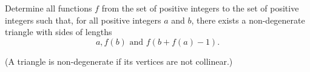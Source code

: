 Determine all functions $ f$ from the set of positive integers to the set of positive integers such that, for all positive integers $ a$ and $ b$,  there exists a non-degenerate triangle with sides of lengths\[ a, f(b) \text{ and } f(b + f(a) - 1).\]

(A triangle is non-degenerate if its vertices are not collinear.)